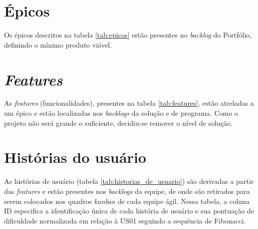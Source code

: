 \documentclass[
	12pt,				%
	oneside,			%
	a4paper,			%
	english,			%
	brazil,				%
	]{abntex2}
\begin{document}
\section{Épicos}
Os épicos descritos na tabela \ref{tab:epicos} estão presentes no \foreignlanguage{english}{\textit{backlog}} do Portfólio, definindo o mínimo produto viável.

\begin{table}[ht]
\end{table}

\section{\textit{Features}}
As \foreignlanguage{english}{\textit{features}} (funcionalidades), presentes na tabela \ref{tab:features}, estão atreladas a um épico e estão localizadas nos \foreignlanguage{english}{\textit{backlogs}} da solução e de programa. Como o projeto não será grande o suficiente, decidiu-se remover o nível de solução.

\begin{table}[htb]
\end{table}

\section{Histórias do usuário}
As histórias de usuário (tabela \ref{tab:historias_de_usuario}) são derivadas a partir das \foreignlanguage{english}{\textit{features}} e estão presentes nos \foreignlanguage{english}{\textit{backlogs}} da equipe, de onde são retirados para serem colocados nos quadros \textit{kanban} de cada equipe ágil. Nessa tabela, a coluna ID especifica a identificação única de cada história de usuário e sua pontuação de dificuldade normalizada em relação à US01 seguindo a sequência de Fibonacci.
\end{document}
